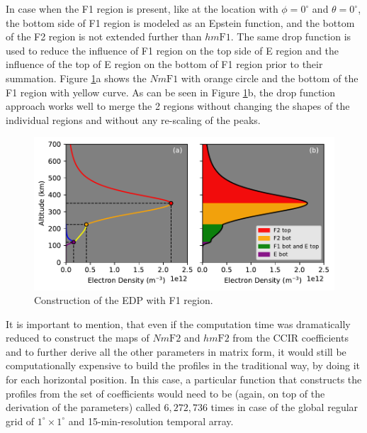 \documentclass[draft]{agujournal2019}
\begin{document}
In case when the F1 region is present, like at the location with $\phi=0^{\circ}$ and $\theta=0^{\circ}$, the bottom side of F1 region is modeled as an Epstein function, and the bottom of the F2 region is not extended further than $hm\mathrm{F1}$. The same drop function is used to reduce the influence of F1 region on the top side of E region and the influence of the top of E region on the bottom of F1 region prior to their summation. Figure \ref{fig:EDP_yes_F1}a shows the $Nm\mathrm{F1}$ with orange circle and the bottom of the F1 region with yellow curve. As can be seen in Figure \ref{fig:EDP_yes_F1}b, the drop function approach works well to merge the 2 regions without changing the shapes of the individual regions and without any re-scaling of the peaks. 

\begin{figure}[H]
  \includegraphics[scale=0.9]{Construction_of_EDP_with_F1.pdf}
  \caption{Construction of the EDP with F1 region.}
  \label{fig:EDP_yes_F1}
\end{figure}



It is important to mention, that even if the computation time was dramatically reduced to construct the maps of $Nm\mathrm{F2}$ and $hm\mathrm{F2}$ from the CCIR coefficients and to further derive all the other parameters in matrix form, it would still be computationally expensive to build the profiles in the traditional way, by doing it for each horizontal position. In this case, a particular function that constructs the profiles from the set of coefficients would need to be (again, on top of the derivation of the parameters) called $6,272,736$ times in case of the global regular grid of $1^{\circ} \times 1^{\circ}$ and 15-min-resolution temporal array. 
\end{document}
